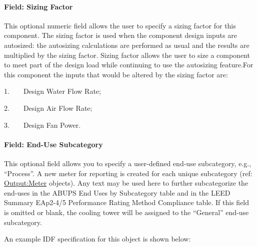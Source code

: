\paragraph{Field: Sizing Factor}\label{field-sizing-factor-2}

This optional numeric field allows the user to specify a sizing factor for this component. The sizing factor is used when the component design inputs are autosized: the autosizing calculations are performed as usual and the results are multiplied by the sizing factor. Sizing factor allows the user to size a component to meet part of the design load while continuing to use the autosizing feature.For this component the inputs that would be altered by the sizing factor are:

1.~~~~Design Water Flow Rate;

2.~~~~Design Air Flow Rate;

3.~~~~Design Fan Power.

\paragraph{Field: End-Use Subcategory}\label{end-use-subcategory-05}

This optional field allows you to specify a user-defined end-use subcategory, e.g., ``Process''. A new meter for reporting is created for each unique subcategory (ref: \hyperref[outputmeter-and-outputmetermeterfileonly]{Output:Meter} objects). Any text may be used here to further subcategorize the end-uses in the ABUPS End Uses by Subcategory table and in the LEED Summary EAp2-4/5 Performance Rating Method Compliance table. If this field is omitted or blank, the cooling tower will be assigned to the ``General'' end-use subcategory.

An example IDF specification for this object is shown below:


